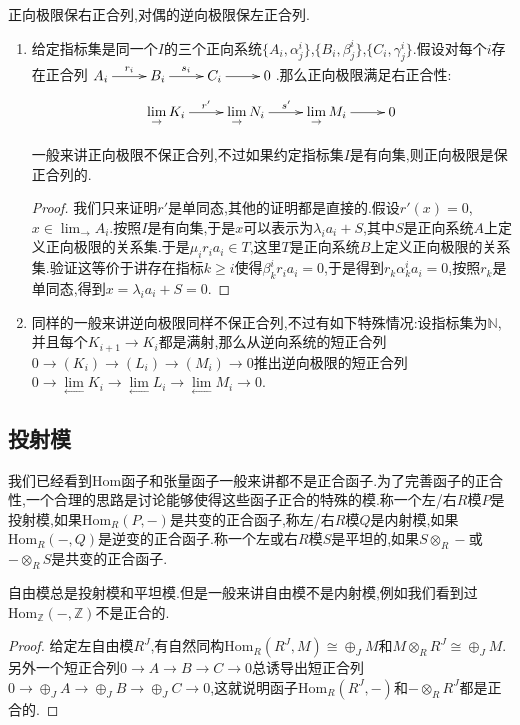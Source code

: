 正向极限保右正合列,对偶的逆向极限保左正合列.
\begin{enumerate}
	\item 给定指标集是同一个$I$的三个正向系统$\{A_i,\alpha_j^i\}$,$\{B_i,\beta_j^i\}$,$\{C_i,\gamma_j^i\}$.假设对每个$i$存在正合列$\xymatrix{A_i\ar[r]^{r_i}&B_i\ar[r]^{s_i}&C_i\ar[r]&0}$.那么正向极限满足右正合性:
	$$\xymatrix{\lim\limits_{\rightarrow}K_i\ar[r]^ {r'}&\lim\limits_{\rightarrow}N_i\ar[r]^{s'}&\lim\limits_{\rightarrow}M_i\ar[r]&0}$$
	
	一般来讲正向极限不保正合列,不过如果约定指标集$I$是有向集,则正向极限是保正合列的.
	\begin{proof}
		
		我们只来证明$r'$是单同态,其他的证明都是直接的.假设$r'(x)=0$,$x\in\lim_{\rightarrow}A_i$.按照$I$是有向集,于是$x$可以表示为$\lambda_ia_i+S$,其中$S$是正向系统$A$上定义正向极限的关系集.于是$\mu_ir_ia_i\in T$,这里$T$是正向系统$B$上定义正向极限的关系集.验证这等价于讲存在指标$k\ge i$使得$\beta_k^ir_ia_i=0$,于是得到$r_k\alpha_k^ia_i=0$,按照$r_k$是单同态,得到$x=\lambda_ia_i+S=0$.
	\end{proof}
    \item 同样的一般来讲逆向极限同样不保正合列,不过有如下特殊情况:设指标集为$\mathbb{N}$,并且每个$K_{i+1}\to K_i$都是满射,那么从逆向系统的短正合列$0\to(K_i)\to(L_i)\to(M_i)\to0$推出逆向极限的短正合列$0\to\lim\limits_{\leftarrow}K_i\to\lim\limits_{\leftarrow}L_i\to\lim\limits_{\leftarrow}M_i\to0$.
\end{enumerate}
\newpage
\subsection{投射模}

我们已经看到Hom函子和张量函子一般来讲都不是正合函子.为了完善函子的正合性,一个合理的思路是讨论能够使得这些函子正合的特殊的模.称一个左/右$R$模$P$是投射模,如果$\mathrm{Hom}_R(P,-)$是共变的正合函子,称左/右$R$模$Q$是内射模,如果$\mathrm{Hom}_R(-,Q)$是逆变的正合函子.称一个左或右$R$模$S$是平坦的,如果$S\otimes_R-$或$-\otimes_R S$是共变的正合函子.

自由模总是投射模和平坦模.但是一般来讲自由模不是内射模,例如我们看到过$\mathrm{Hom}_{\mathbb{Z}}(-,\mathbb{Z})$不是正合的.
\begin{proof}
	
	给定左自由模$R^J$,有自然同构$\mathrm{Hom}_R(R^J,M)\cong\oplus_JM$和$M\otimes_RR^J\cong\oplus_JM$.另外一个短正合列$0\to A\to B\to C\to0$总诱导出短正合列$0\to\oplus_JA\to\oplus_JB\to\oplus_JC\to0$,这就说明函子$\mathrm{Hom}_R(R^J,-)$和$-\otimes_RR^J$都是正合的.
\end{proof}

